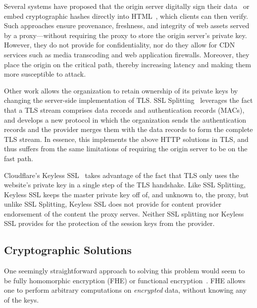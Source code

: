 %
Several systems have proposed that the origin server digitally
sign their data~\cite{cdn-on-demand,stickler} or embed cryptographic hashes
directly into
HTML~\cite{w3c-subresource-integrity,w3c-content-security-policy}, which
clients can then verify.
%
Such approaches ensure provenance, freshness, and integrity of web assets
served by a proxy---without requiring the proxy to store the origin server's
private key.
%
However, they do not provide for confidentiality, nor do they allow for CDN
services such as media transcoding and web application firewalls.
%
Moreover, they place the origin on the critical path, thereby increasing
latency and making them more susceptible to attack.


%
Other work allows the organization to retain ownership of its private keys by
changing the server-side implementation of TLS.
%
SSL Splitting~\cite{ssl-splitting} leverages the fact that a TLS stream
comprises data records and authentication records (MACs), and develops a new
protocol in which the organization sends the authentication records and the
provider merges them with the data records to form the complete TLS stream.
%
In essence, this implements the above HTTP solutions in TLS, and thus suffers
from the same limitations of requiring the origin server to be on the fast
path.

Cloudflare's Keyless SSL~\cite{keyless-ssl} takes advantage of the fact that
TLS only uses the website's private key in a single step of the TLS handshake.
%
Like SSL Splitting, Keyless SSL keeps the master private key off of, and unknown
to, the proxy, but unlike SSL Splitting, Keyless SSL does not provide for
content provider endorsement of the content the proxy serves.  
%
Neither SSL splitting nor Keyless SSL provides for the protection of the
session keys from the provider.


\subsection{Cryptographic Solutions}
%
One seemingly straightforward approach to solving this problem would seem to be
fully homomorphic encryption (FHE) or functional
encryption~\cite{gentry2009fully, gentry2010computing, garg2016candidate}.
%
FHE allows one to perform arbitrary computations on \textit{encrypted} data,
without knowing any of the keys.  
%

